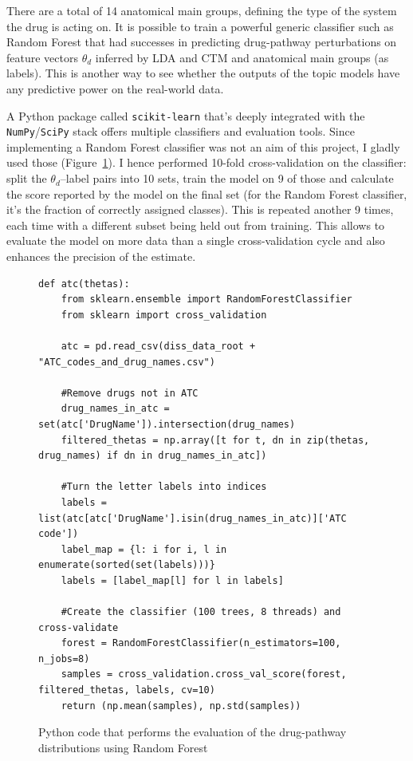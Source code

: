 \documentclass[12pt,a4paper,twoside,openright]{report}
\begin{document}
There are a total of 14 anatomical main groups, defining the type of the system the drug is acting on. It is possible to train a powerful generic classifier such as Random Forest\cite{Breiman:2001:RF:570181.570182} that had successes in predicting drug-pathway perturbations\cite{Riddick15012011} on feature vectors $\theta_d$ inferred by LDA and CTM and anatomical main groups (as labels). This is another way to see whether the outputs of the topic models have any predictive power on the real-world data.

A Python package called \texttt{scikit-learn} \cite{scikit-learn} that's deeply integrated with the \texttt{NumPy}/\texttt{SciPy} stack offers multiple classifiers and evaluation tools. Since implementing a Random Forest classifier was not an aim of this project, I gladly used those (Figure~\ref{fig:atc-python}). I hence performed 10-fold cross-validation on the classifier: split the $\theta_d$--label pairs into 10 sets, train the model on 9 of those and calculate the score reported by the model on the final set (for the Random Forest classifier, it's the fraction of correctly assigned classes). This is repeated another 9 times, each time with a different subset being held out from training. This allows to evaluate the model on more data than a single cross-validation cycle and also enhances the precision of the estimate.

\begin{figure}
\begin{Verbatim}[fontsize=\scriptsize]
def atc(thetas):
    from sklearn.ensemble import RandomForestClassifier
    from sklearn import cross_validation

    atc = pd.read_csv(diss_data_root + "ATC_codes_and_drug_names.csv")

    #Remove drugs not in ATC
    drug_names_in_atc = set(atc['DrugName']).intersection(drug_names)
    filtered_thetas = np.array([t for t, dn in zip(thetas, drug_names) if dn in drug_names_in_atc])
        
    #Turn the letter labels into indices
    labels = list(atc[atc['DrugName'].isin(drug_names_in_atc)]['ATC code'])
    label_map = {l: i for i, l in enumerate(sorted(set(labels)))}
    labels = [label_map[l] for l in labels]
    
    #Create the classifier (100 trees, 8 threads) and cross-validate
    forest = RandomForestClassifier(n_estimators=100, n_jobs=8)
    samples = cross_validation.cross_val_score(forest, filtered_thetas, labels, cv=10)
    return (np.mean(samples), np.std(samples))
\end{Verbatim}
\caption{Python code that performs the evaluation of the drug-pathway distributions using Random Forest}
\label{fig:atc-python}
\end{figure}
\end{document}
